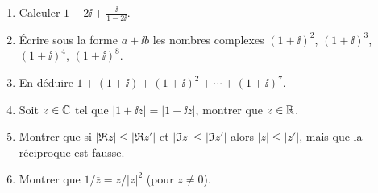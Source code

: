 \begin{frame}
\begin{miniexercice}
 \begin{enumerate}
  \setlength{\itemsep}{1em}
  \vspace{1em}
  \item Calculer $1 - 2\ii + \frac{\ii}{1 - 2\ii}$.
  \item \'Ecrire sous la forme $a+\ii b$ les nombres complexes $(1+\ii)^2$,
$(1+\ii)^3$, $(1+\ii)^4$, $(1+\ii)^8$.
  \item En déduire $1+(1+\ii)+(1+\ii)^2+\cdots +(1+\ii)^7$.
  \item Soit $z\in \mathbb{C}$ tel que $|1+ \ii z| = |1-\ii z|$, montrer que $z \in \mathbb{R}$.
  \item Montrer que si $|\Re z| \le |\Re z'|$ et $|\Im z| \le |\Im z'|$ alors
$|z| \le |z'|$, mais que la réciproque est fausse.
  \item Montrer que $1 / \overline{z} = z/\left| z \right|^2$ (pour $z\neq 0$).
\end{enumerate}
\end{miniexercice}
\end{frame}




